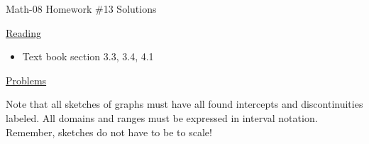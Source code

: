 \documentclass[letterpaper,12pt,fleqn]{article}
\begin{document}
\begin{center}
\Large Math-08 Homework \#13 Solutions
\end{center}

\vspace{0.5in}

\underline{Reading}

\begin{itemize}
\item Text book section 3.3, 3.4, 4.1
\end{itemize}

\underline{Problems}

Note that all sketches of graphs must have all found intercepts and
discontinuities labeled. All domains and ranges must be expressed in
interval notation. Remember, sketches do not have to be to scale!
\end{document}
